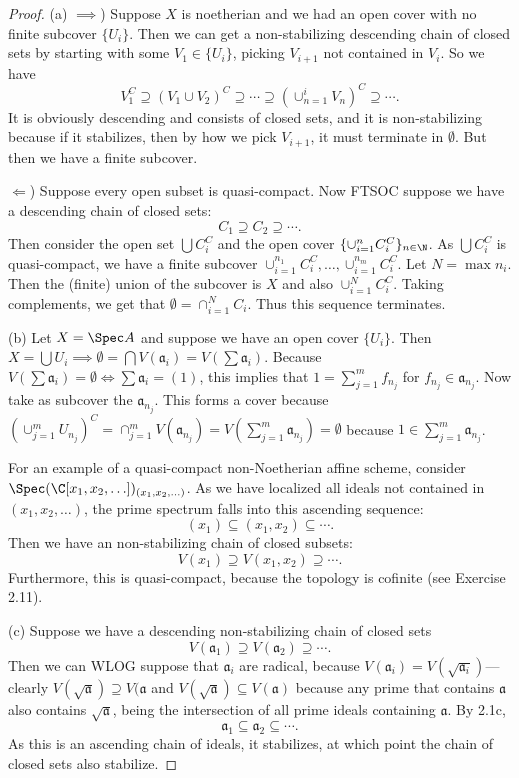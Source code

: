 \begin{proof}
	(a) $\implies $) Suppose $X $ is noetherian and we had an open cover with no finite subcover $\{U_i\}  $.
	Then we can get a non-stabilizing descending chain of closed sets by starting with some $V_1 \in \{U_i\}   $, picking $V_{i+1} $ not contained in $V_i $.
	So we have
	\[
		V_1^C \supseteq (V_1\cup V_{2})^C \supseteq \cdots \supseteq (\cup_{n = 1}^i V_n)^C \supseteq \cdots
	.\]
	It is obviously descending and consists of closed sets, and it is non-stabilizing because if it stabilizes, then by how we pick $V_{i+1} $, it must terminate in $\emptyset $.
	But then we have a finite subcover.

	$\Leftarrow $) Suppose every open subset is quasi-compact.
	Now FTSOC suppose we have a descending chain of closed sets:
	\[
		C_{1} \supseteq C_{2} \supseteq \cdots
	.\]
	Then consider the open set $\bigcup C_i^C $ and the open cover $\{\cup_{i=1}^n C_i^C\}_{n\in \N}   $.
	As $\bigcup C_i^C $ is quasi-compact, we have a finite subcover $\cup_{i=1}^{n_1} C_i^C, \ldots, \cup_{i=1}^{n_m}C_i^C $.
	Let $N = \max n_i $.
	Then the (finite) union of the subcover is $X $ and also $\cup_{i=1}^N C_i^C$.
	Taking complements, we get that $\emptyset = \cap_{i=1}^N C_i $.
	Thus this sequence terminates.

	(b) Let $X = \Spec A $ and suppose we have an open cover $\{U_i\} $.
	Then $X = \bigcup U_i \implies \emptyset = \bigcap V(\mathfrak{a}_i) = V(\sum \mathfrak{a}_i)$.
	Because $V(\sum \mathfrak{a}_i) = \emptyset \iff \sum \mathfrak{a}_i = (1) $, this implies that $1 = \sum_{j=1}^m f_{n_j} $ for $f_{n_j} \in \mathfrak{a}_{n_j} $.
	Now take as subcover the $\mathfrak{a}_{n_j} $.
	This forms a cover because $(\cup_{j=1}^m U_{n_j})^C = \cap_{j=1}^m V(\mathfrak{a}_{n_j}) = V(\sum_{j=1}^m \mathfrak{a}_{n_j}) = \emptyset$ because $1 \in \sum_{j=1}^m \mathfrak{a}_{n_j} $.

	For an example of a quasi-compact non-Noetherian affine scheme, consider $\Spec (\C[x_{1},x_{2},\ldots])_{(x_{1},x_{2},\ldots)} $.
	As we have localized all ideals not contained in $(x_{1},x_{2},\ldots) $, the prime spectrum falls into this ascending sequence:
	\[
		(x_{1}) \subseteq (x_{1},x_{2}) \subseteq \cdots
	.\]
	Then we have an non-stabilizing chain of closed subsets:
	\[
		V(x_{1}) \supseteq V(x_{1},x_{2}) \supseteq \cdots
	.\]
	Furthermore, this is quasi-compact, because the topology is cofinite (see Exercise 2.11).

	(c) Suppose we have a descending non-stabilizing chain of closed sets
	\[
		V(\mathfrak{a}_1) \supseteq V(\mathfrak{a}_2) \supseteq \cdots
	.\]
	Then we can WLOG suppose that $\mathfrak{a}_i $ are radical, because $V(\mathfrak{a}_i) = V(\sqrt{\mathfrak{a}_i}) $---clearly $V(\sqrt{\mathfrak{a}} ) \supseteq V(\mathfrak{a} $ and $V(\sqrt{\mathfrak{a}} ) \subseteq V(\mathfrak{a}) $ because any prime that contains $\mathfrak{a} $ also contains $\sqrt{\mathfrak{a}}  $, being the intersection of all prime ideals containing $\mathfrak{a} $.
	By 2.1c,
	\[
		\mathfrak{a}_1 \subseteq \mathfrak{a}_2 \subseteq \cdots
	.\]
	As this is an ascending chain of ideals, it stabilizes, at which point the chain of closed sets also stabilize.


\end{proof}
